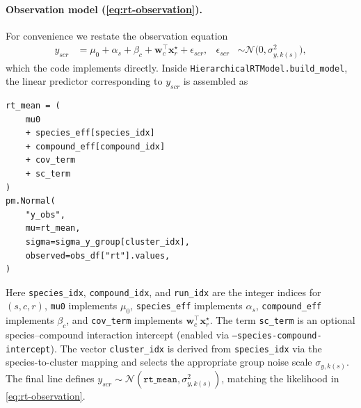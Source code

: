 \documentclass[11pt]{article}
\begin{document}
\paragraph{Observation model \texorpdfstring{(\eqref{eq:rt-observation})}{(2.1)}.}
For convenience we restate the observation equation
\begin{align*}
  y_{scr}
  &=
  \mu_0
  +
  \alpha_{s}
  +
  \beta_{c}
  +
  \bm{w}_{c}^{\top}\bm{x}^{\star}_{r}
  +
  \epsilon_{scr},
  &
  \epsilon_{scr} &\sim\mathcal{N}\!\bigl(0,\sigma^2_{y,k(s)}\bigr),
\end{align*}
which the code implements directly. Inside \texttt{HierarchicalRTModel.build\_model},
the linear predictor corresponding to $y_{scr}$ is assembled as
\begin{verbatim}
rt_mean = (
    mu0
    + species_eff[species_idx]
    + compound_eff[compound_idx]
    + cov_term
    + sc_term
)
pm.Normal(
    "y_obs",
    mu=rt_mean,
    sigma=sigma_y_group[cluster_idx],
    observed=obs_df["rt"].values,
)
\end{verbatim}
Here \texttt{species\_idx}, \texttt{compound\_idx}, and \texttt{run\_idx} are the
integer indices for $(s,c,r)$, \texttt{mu0} implements $\mu_0$, \texttt{species\_eff}
implements $\alpha_s$, \texttt{compound\_eff} implements $\beta_c$, and \texttt{cov\_term}
implements $\bm{w}_c^{\top}\bm{x}^{\star}_r$. The term \texttt{sc\_term} is an optional
species--compound interaction intercept (enabled via \texttt{--species-compound-intercept}).
The vector \texttt{cluster\_idx} is derived from \texttt{species\_idx} via the species-to-cluster
mapping and selects the appropriate group noise scale $\sigma_{y,k(s)}$. The final line defines
$y_{scr}\sim\mathcal{N}(\texttt{rt\_mean},\sigma^2_{y,k(s)})$, matching the likelihood in
\eqref{eq:rt-observation}.
\end{document}
